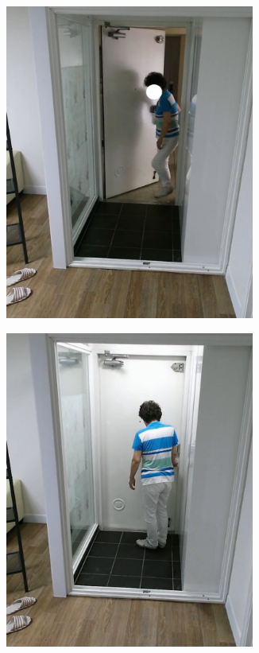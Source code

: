 \documentclass[thesis]{mas_proposal}
\begin{document}
\begin{figure}[htb!]
	\centering
	\begin{subfigure}[b]{0.22\textwidth}
		\centering
		\includegraphics[width=0.9\textwidth]{images/dataset/1.png}
		\subcaption{}%
		\label{subfig:seq1}
	\end{subfigure}
	\begin{subfigure}[b]{0.22\textwidth}
		\centering
		\includegraphics[width=0.9\textwidth]{images/dataset/2.png}

\end{subfigure}
\end{figure}
\end{document}
